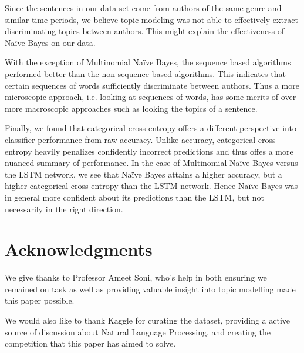 \documentclass{article}
\begin{document}
Since the sentences in our data set come from authors of the same genre
and similar time periods, we believe topic modeling was not able to effectively
extract discriminating topics between authors. This might explain the effectiveness
of Na\"ive Bayes on our data.

With the exception of Multinomial Na\"ive Bayes, the sequence based
algorithms performed better than the non-sequence based algorithms. This
indicates that certain sequences of words sufficiently discriminate
between authors. Thus a more microscopic approach, i.e. looking at 
sequences of words, has some merits of over more macroscopic approaches
such as looking the topics of a sentence.

Finally, we found that categorical cross-entropy offers a different perspective
into classifier performance from raw accuracy. Unlike accuracy, categorical
cross-entropy heavily penalizes confidently incorrect predictions and thus
offes a more nuanced summary of performance. In the case of Multinomial
Na\"ive Bayes versus the LSTM network, we see that Na\"ive Bayes attains a
higher accuracy, but a higher categorical cross-entropy than the LSTM network.
Hence Na\"ive Bayes was in general more confident about its predictions than
the LSTM, but not necessarily in the right direction.

\section*{Acknowledgments}


We give thanks to Professor Ameet Soni, who's help in both ensuring we remained on task as well as providing valuable insight into topic modelling made this paper possible. 

We would also like to thank Kaggle for curating the dataset, providing a active source of discussion about Natural Language Processing, and creating the competition that this paper has aimed to solve. 






\end{document}
